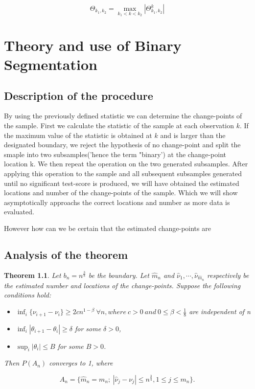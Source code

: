 \documentclass[a4paper, 12pt, notitlepage]{report}
\newtheorem{theorem}{Theorem}[chapter]
\begin{document}
\[\Theta_{k_1, k_2} = \max_{k_1 < k < k_2}|\Theta^k_{k_1, k_2}|\]

\chapter{Theory and use of Binary Segmentation}
%
\section{Description of the procedure}
%
By using the previously defined statistic we can determine the change-points of the sample. First we calculate the statistic of the sample at each observation $k$. If the maximum value of the statistic is obtained at $k$ and is larger than the designated boundary, we reject the hypothesis of no change-point and split the smaple into two subsamples('hence the term "binary') at the change-point location k. We then repeat the operation on the two generated subsamples. After applying this operation to the sample and all subsequent subsamples generated until no significant test-score is produced, we will have obtained the estimated locations and number of the change-points of the sample. Which we will show asymptotically approachs the correct locations and number as more data is evaluated.  %

However how can we be certain that the estimated change-points are 

\section{Analysis of the theorem}
%
\begin{theorem}
 
Let \(b_n = n^{\frac{3}{8}}\) be the boundary. Let \( \hat m_n  \) and \( \hat \nu_1, \cdots, \hat \nu_{ \hat m_n} \) respectively be the estimated number and locations of the change-points. Suppose the following conditions hold:
\begin{itemize}

\item[(i)] \( \inf_i \{ \nu_{i+1} - \nu_i \} \geq 2cn^{1 - \beta} \ \forall n, where \ c >0 \ and \ 0 \leq \beta < \frac{1}{8} \) are independent of n

\item[(ii)] \(\inf_i |\theta_{i+1} - \theta_{i}| \geq \delta\) for some \(\delta > 0\),

\item[(iii)]\(\sup_i |\theta_i| \leq B\) for some \( B > 0\).

\end{itemize}

Then $P(A_n)$ converges to 1, where

\[ A_n = \{\hat m_n = m_n;\ | \hat \nu_j - \nu_j| \leq n^{\frac{3}{4}}, 1 \leq j \leq m_n \}.\]

\end{theorem}
\end{document}
